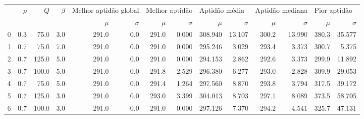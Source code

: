 \begin{tabular}{lrrrrrrrrrrrrr}
\toprule
 & $\rho$ & $Q$   & $\beta$ & \multicolumn{2}{p{2.0cm}}{Melhor aptidão global} & \multicolumn{2}{l}{Melhor aptidão} & \multicolumn{2}{l}{Aptidão média} & \multicolumn{2}{l}{Aptidão mediana} & \multicolumn{2}{l}{Pior aptidão}                         \\
 &        &       &         & $\mu$                                            & $\sigma$                           & $\mu$                             & $\sigma$                            & $\mu$   & $\sigma$ & $\mu$ & $\sigma$ & $\mu$ & $\sigma$ \\
\midrule
0  & 0.3    & 75.0  & 3.0     & 291.0                                            & 0.0                                & 291.0                             & 0.000                               & 308.940 & 13.107   & 300.2 & 13.990   & 380.3 & 35.577   \\
1  & 0.7    & 75.0  & 7.0     & 291.0                                            & 0.0                                & 291.0                             & 0.000                               & 295.246 & 3.029    & 293.4 & 3.373    & 300.7 & 5.375    \\
2  & 0.7    & 125.0 & 5.0     & 291.0                                            & 0.0                                & 291.0                             & 0.000                               & 294.153 & 2.862    & 292.6 & 3.373    & 299.9 & 11.892   \\
3  & 0.7    & 100.0 & 5.0     & 291.0                                            & 0.0                                & 291.8                             & 2.529                               & 296.380 & 6.277    & 293.0 & 2.828    & 309.9 & 29.053   \\
4  & 0.7    & 75.0  & 5.0     & 291.0                                            & 0.0                                & 291.4                             & 1.264                               & 297.560 & 8.870    & 293.8 & 3.794    & 317.5 & 39.172   \\
5  & 0.7    & 125.0 & 3.0     & 291.0                                            & 0.0                                & 293.0                             & 3.399                               & 304.013 & 8.703    & 297.1 & 8.089    & 373.5 & 58.705   \\
6  & 0.7    & 100.0 & 3.0     & 291.0                                            & 0.0                                & 291.0                             & 0.000                               & 297.126 & 7.370    & 294.2 & 4.541    & 325.7 & 47.131   \\

\end{tabular}
